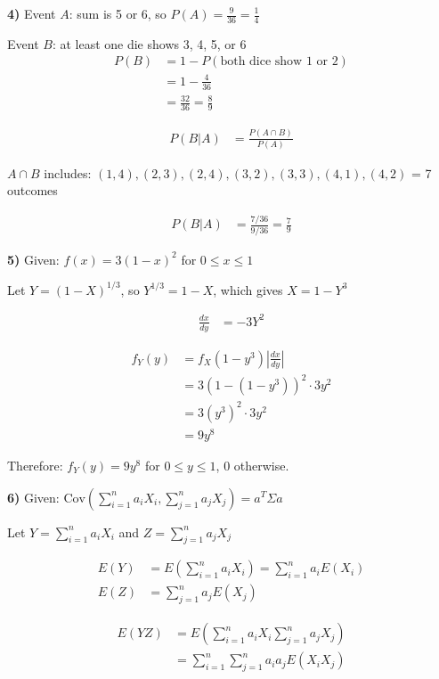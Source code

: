 \documentclass{article}
\begin{document}
\textbf{4)} Event $A$: sum is 5 or 6, so $P(A) = \frac{9}{36} = \frac{1}{4}$

Event $B$: at least one die shows 3, 4, 5, or 6
\begin{align}
P(B) &= 1 - P(\text{both dice show 1 or 2}) \\
&= 1 - \frac{4}{36} \\
&= \frac{32}{36} = \frac{8}{9}
\end{align}

\begin{align}
P(B|A) &= \frac{P(A \cap B)}{P(A)}
\end{align}

$A \cap B$ includes: $(1,4), (2,3), (2,4), (3,2), (3,3), (4,1), (4,2)$ = 7 outcomes

\begin{align}
P(B|A) &= \frac{7/36}{9/36} = \frac{7}{9}
\end{align}

\textbf{5)} Given: $f(x) = 3(1-x)^2$ for $0 \leq x \leq 1$

Let $Y = (1-X)^{1/3}$, so $Y^{1/3} = 1-X$, which gives $X = 1-Y^3$

\begin{align}
\frac{dx}{dy} &= -3Y^2
\end{align}

\begin{align}
f_Y(y) &= f_X(1-y^3) \left|\frac{dx}{dy}\right| \\
&= 3(1-(1-y^3))^2 \cdot 3y^2 \\
&= 3(y^3)^2 \cdot 3y^2 \\
&= 9y^8
\end{align}

Therefore: $f_Y(y) = 9y^8$ for $0 \leq y \leq 1$, 0 otherwise.

\textbf{6)} Given: $\text{Cov}(\sum_{i=1}^n a_i X_i, \sum_{j=1}^n a_j X_j) = a^T \Sigma a$

Let $Y = \sum_{i=1}^n a_i X_i$ and $Z = \sum_{j=1}^n a_j X_j$

\begin{align}
E(Y) &= E\left(\sum_{i=1}^n a_i X_i\right) = \sum_{i=1}^n a_i E(X_i) \\
E(Z) &= \sum_{j=1}^n a_j E(X_j)
\end{align}

\begin{align}
E(YZ) &= E\left(\sum_{i=1}^n a_i X_i \sum_{j=1}^n a_j X_j\right) \\
&= \sum_{i=1}^n \sum_{j=1}^n a_i a_j E(X_i X_j)
\end{align}
\end{document}
